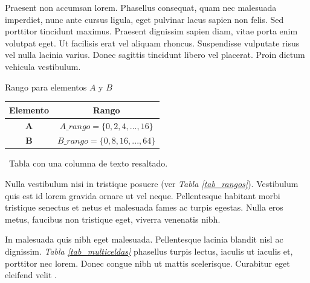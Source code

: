 \documentclass[12pt, a4paper]{article}
\newcounter{apatablecounter}
\newenvironment{apa_table}[4]
{
\refstepcounter{apatablecounter}%
\addcontentsline{lot}{table}{Tabla \theapatablecounter: #1 }%

\begin{center}
\begin{tabular}{c}
\textbf{Tabla \theapatablecounter: }\\
\textit{#1} \\ \vspace{5mm}
#2 \\

#3\\
#4
}
{
\end{tabular}
\end{center}
}
\begin{document}
Praesent non accumsan lorem. Phasellus consequat, quam nec malesuada imperdiet, nunc ante cursus ligula, eget pulvinar lacus sapien non felis. Sed porttitor tincidunt maximus. Praesent dignissim sapien diam, vitae porta enim volutpat eget. Ut facilisis erat vel aliquam rhoncus. Suspendisse vulputate risus vel nulla lacinia varius. Donec sagittis tincidunt libero vel placerat. Proin dictum vehicula vestibulum. 

\begin{apa_table}
{Rango para elementos $A$ y $B$}
{
\begin{tabular}{|c|c|}
     \hline
     \textbf{Elemento} & \textbf{Rango} \\
     \hline
     $\textbf{A}$ & $A\_rango = \{0, 2, 4, ..., 16\}$\\
     \hline
     $\textbf{B}$\footnotemark & $B\_rango = \{0, 8, 16, ..., 64\}$\\
     \hline
\end{tabular}
}
{\ Tabla con una columna de texto resaltado.}
{\ }
\label{tab_rangos}
\end{apa_table}


Nulla vestibulum nisi in tristique posuere (ver \textit{Tabla \ref{tab_rangos}}). Vestibulum quis est id lorem gravida ornare ut vel neque. Pellentesque habitant morbi tristique senectus et netus et malesuada fames ac turpis egestas. Nulla eros metus, faucibus non tristique eget, viverra venenatis nibh. 

In malesuada quis nibh eget malesuada. Pellentesque lacinia blandit nisl ac dignissim. \textit{Tabla \ref{tab_multiceldas}} phasellus turpis lectus, iaculis ut iaculis et, porttitor nec lorem. Donec congue nibh ut mattis scelerisque. Curabitur eget eleifend velit .
\end{document}
